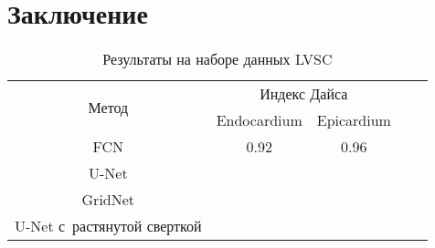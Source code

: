 \section{Заключение}

\begin{table}[b]
  \begin{center}
    \caption{Результаты на наборе данных LVSC} \label{tab:lvsc_results}
    \begin{tabular}{ |*{5}{c|} }
      \hline
      \multirow{2}{*}{Метод}      & \multicolumn{2}{c|}{Индекс Дайса} \\ \cline{2-5}
                                  & Endocardium & Epicardium          \\ \hline
      \hline
      FCN                         & 0.92        & 0.96                \\ \hline
      U-Net                       &             &                     \\ \hline
      GridNet                     &             &                     \\ \hline
      U-Net с~растянутой сверткой &             &                     \\ 
      \hline
    \end{tabular}
  \end{center}
\end{table}

